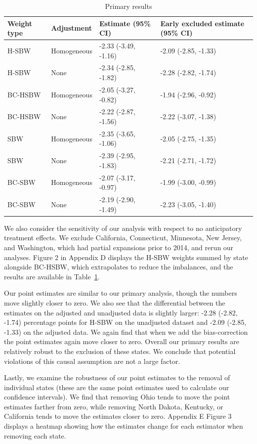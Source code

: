 \documentclass[aoas]{imsart}
\theoremstyle{plain}
\theoremstyle{remark}
\begin{document}
\begin{table}[ht]
\label{tab:mainresults}
\caption{Primary results}
\begin{tabular}{llll}
  \hline
Weight type & Adjustment & Estimate (95\% CI) & Early excluded estimate (95\% CI) \\ 
  \hline
H-SBW & Homogeneous & -2.33 (-3.49, -1.16) & -2.09 (-2.85, -1.33) \\ 
  H-SBW & None & -2.34 (-2.85, -1.82) & -2.28 (-2.82, -1.74) \\ 
  BC-HSBW & Homogeneous & -2.05 (-3.27, -0.82) & -1.94 (-2.96, -0.92) \\ 
  BC-HSBW & None & -2.22 (-2.87, -1.56) & -2.22 (-3.07, -1.38) \\ 
  SBW & Homogeneous & -2.35 (-3.65, -1.06) & -2.05 (-2.75, -1.35) \\ 
  SBW & None & -2.39 (-2.95, -1.83) & -2.21 (-2.71, -1.72) \\ 
  BC-SBW & Homogeneous & -2.07 (-3.17, -0.97) & -1.99 (-3.00, -0.99) \\ 
  BC-SBW & None & -2.19 (-2.90, -1.49) & -2.23 (-3.05, -1.40) \\ 
   \hline
\end{tabular}
\end{table}

We also consider the sensitivity of our analysis with respect to no anticipatory treatment effects. We exclude California, Connecticut, Minnesota, New Jersey, and Washington, which had partial expansions prior to 2014, and rerun our analyses. Figure 2 in Appendix D displays the H-SBW weights summed by state alongside BC-HSBW, which extrapolates to reduce the imbalances, and the results are available in Table~\ref{tab:mainresults}.

Our point estimates are similar to our primary analysis, though the numbers move slightly closer to zero. We also see that the differential between the estimates on the adjusted and unadjusted data is slightly larger: -2.28 (-2.82, -1.74) percentage points for H-SBW on the unadjusted dataset and -2.09 (-2.85, -1.33) on the adjusted data. We again find that when we add the bias-correction the point estimates again move closer to zero. Overall our primary results are relatively robust to the exclusion of these states. We conclude that potential violations of this causal assumption are not a large factor.

Lastly, we examine the robustness of our point estimates to the removal of individual states (these are the same point estimates used to calculate our confidence intervals). We find that removing Ohio tends to move the point estimates farther from zero, while removing North Dakota, Kentucky, or California tends to move the estimates closer to zero. Appendix E Figure 3 displays a heatmap showing how the estimates change for each estimator when removing each state.
\end{document}
